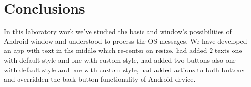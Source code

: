 \section*{Conclusions}

In this laboratory work we've studied the basic and window's possibilities of Android window and understood to process the OS messages. We have developed an app with text in the middle which re-center on resize, had added 2 texts one with default style and one with custom style, had added two buttons also one with default style and one with custom style, had added actions to both buttons and overridden the back button functionality of Android device.

\clearpage